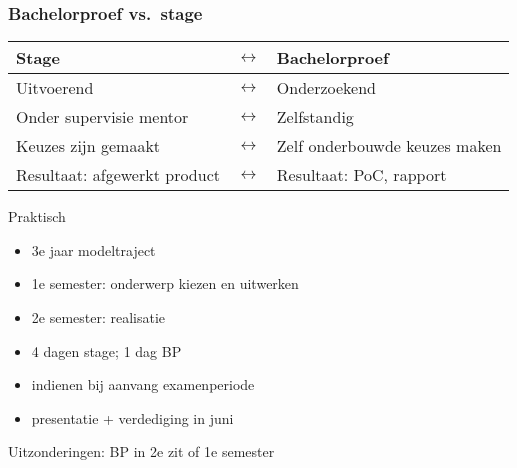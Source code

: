 \documentclass[aspectratio=169]{beamer}
\begin{document}
\begin{frame}
  \frametitle{Bachelorproef vs.\ stage}

  \centering
  \begin{tabular}{lcl}
    \toprule
    \textbf{Stage}               & $\leftrightarrow$ & \textbf{Bachelorproef}        \\
    \midrule
    Uitvoerend                   & $\leftrightarrow$ & Onderzoekend                  \\
    Onder supervisie mentor      & $\leftrightarrow$ & Zelfstandig                   \\
    Keuzes zijn gemaakt          & $\leftrightarrow$ & Zelf onderbouwde keuzes maken \\
    Resultaat: afgewerkt product & $\leftrightarrow$ & Resultaat: PoC, rapport       \\
    \bottomrule
  \end{tabular}
\end{frame}

\begin{frame}{Praktisch}

  \begin{itemize}
    \item 3e jaar modeltraject
    \item 1e semester: onderwerp kiezen en uitwerken
    \item 2e semester: realisatie
    \item 4 dagen stage; 1 dag BP
    \item indienen bij aanvang examenperiode
    \item presentatie + verdediging in juni
  \end{itemize}

  \bigskip

  Uitzonderingen: BP in 2e zit of 1e semester
\end{frame}
\end{document}
